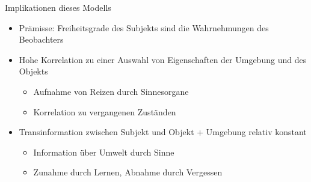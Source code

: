 \begin{frame}{Implikationen dieses Modells}
	\begin{itemize}
		\item{Prämisse: Freiheitsgrade des Subjekts sind die Wahrnehmungen des Beobachters}
		\item{Hohe Korrelation zu einer Auswahl von Eigenschaften der Umgebung und des Objekts}
		\begin{itemize}
			\item{Aufnahme von Reizen durch Sinnesorgane}
			\item{Korrelation zu vergangenen Zuständen}
		\end{itemize}
		\item{Transinformation zwischen Subjekt und Objekt + Umgebung relativ konstant}
			\begin{itemize}
					\item{Information über Umwelt durch Sinne}
					\item{Zunahme durch Lernen, Abnahme durch Vergessen}
			\end{itemize}
	\end{itemize}
\end{frame}